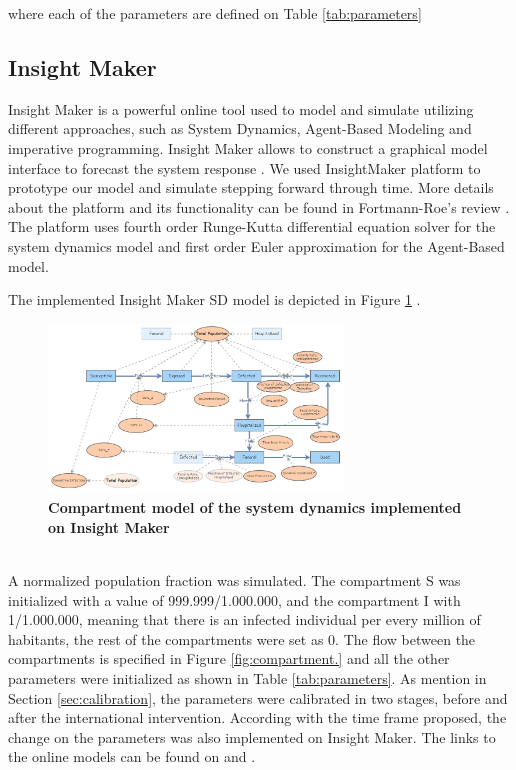 \documentclass[10pt]{article}
\begin{document}
\noindent where each of the parameters are defined on Table \ref{tab:parameters} \\


\subsection{Insight Maker}
 Insight Maker is a powerful online tool used to model and simulate utilizing different approaches, such as System Dynamics, Agent-Based Modeling and imperative programming. Insight Maker allows to construct a graphical model interface to forecast the system response \cite{FortmannRoe}. We used InsightMaker platform to prototype our model and simulate stepping forward through time. More details about the platform and its functionality can be found in Fortmann-Roe's review \cite{FortmannRoe}. The platform uses fourth order Runge-Kutta differential equation solver for the system dynamics model and  first order Euler approximation for the Agent-Based model.

\noindent The implemented Insight Maker SD model is depicted in Figure \ref{fig:SD_IM} .


\begin{figure}[!h]
  \centering
  \includegraphics[width=0.7\textwidth]{SD_IM}
  \caption{ \bf Compartment model of the system dynamics implemented on Insight Maker}
\label{fig:SD_IM} 
\end{figure}\\

\noindent A normalized population fraction was simulated. The compartment S was initialized with a value of 999.999/1.000.000, and the compartment I with 1/1.000.000, meaning that there is an infected individual per every million of habitants, the rest of the compartments were set as 0. The flow between the compartments is specified in Figure \ref{fig:compartment.} and all the other parameters were initialized as shown in Table \ref{tab:parameters}.  As mention in Section \ref{sec:calibration}, the parameters were calibrated in two stages, before and after the international intervention. According with the time frame proposed, the change on the parameters was also implemented on Insight Maker. The links to the online models can be found on \cite{IM_AI} and  \cite{IM_BI}.  \\
\end{document}
